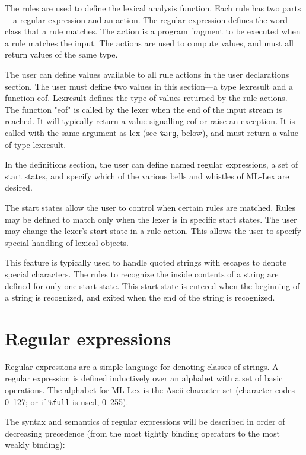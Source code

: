 \documentclass{article}
\begin{document}
The rules are used to define the lexical analysis function.  Each
rule has two parts---a regular expression and an action.  The regular
expression defines the word class that a rule matches.  The action is
a program fragment to be executed when a rule matches the input.  The
actions are used to compute values, and must all return values of the
same type.

The user can define values available to all rule actions in the user
declarations section.  The user must define two values in this
section---a type lexresult and a function eof.  Lexresult defines the
type of values returned by the rule actions.  The function "eof" is
called by the lexer when the end of the input stream is reached.  It
will typically return a value signalling eof or raise an exception.
It is called with the same argument as lex (see \verb|%arg|, below),
and must return a value of type lexresult.

In the definitions section, the user can define named regular
expressions, a set of start states, and specify which of the various
bells and whistles of ML-Lex are desired.

The start states allow the user to control when certain rules are
matched.  Rules may be defined to match only when the lexer is in
specific start states.  The user may change the lexer's start state
in a rule action.  This allows the user to specify special handling
of lexical objects.

This feature is typically used to handle quoted strings with escapes
to denote special characters.  The rules to recognize the inside
contents of a string are defined for only one start state.  This
start state is entered when the beginning of a string is recognized,
and exited when the end of the string is recognized.

\section{Regular expressions}

Regular expressions are a simple language for denoting classes of
strings.  A regular expression is defined inductively over an
alphabet with a set of basic operations.  The alphabet for ML-Lex is
the Ascii character set (character codes 0--127; or if 
\verb|%full| is used, 0--255).

The syntax and semantics of regular expressions will be described in
order of decreasing precedence (from the most tightly binding operators
to the most weakly binding):
\end{document}
